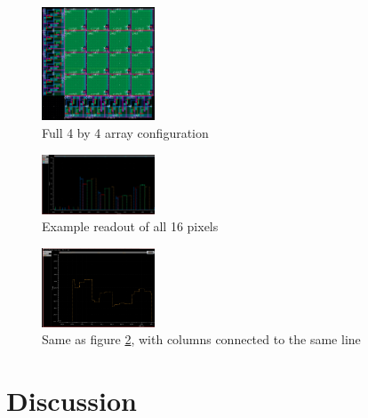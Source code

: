 \documentclass[lettersize,journal]{IEEEtran}
\begin{document}
\begin{figure}[h]
	\centering
	\includegraphics[width =0.3\textwidth]{fullarraylayout.png}
	\caption{Full 4 by 4 array configuration}
	\label{fullarrayreadout}
\end{figure}

\begin{figure}[h]
	\centering
	\includegraphics[width =0.3\textwidth]{fourcolreadoutBEST.png}
	\caption{Example readout of all 16 pixels}
	\label{fourcolreadout}
\end{figure}
\begin{figure}[h]
	\centering
	\includegraphics[width =0.3\textwidth]{transamelinereadout.png}
	\caption{Same as figure \ref{fourcolreadout}, with columns connected to the same line}
	\label{}
\end{figure}


\section{Discussion}
\end{document}
